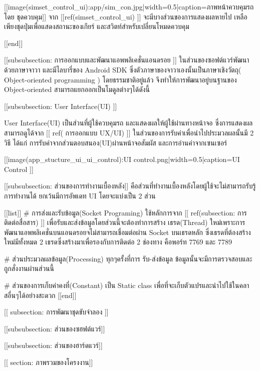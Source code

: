 				[[image(simset_control_ui):app/sim_con.jpg|width=0.5|caption=ภาพหน้าควบคุมรถโดย ชุดควบคุม]]
				จาก [[ref(simset_control_ui) ]] จะมีบางส่วนของการแสดงผลหายไป เหลือเพียงชุดปุ่มเพื่อแสดงสถานะของเกียร์ และสวิตท์สำหรับเปลี่ยนโหมดควบคุม


	        [[end]]

		[[subsubsection: การออกแบบและพัฒนาแอพพลิเคชั่นแอนดรอย ]]
			ในส่วนของซอฟต์แวร์พัฒนาด้วยภาษาจาวา และมีไลบารี่ของ Android SDK ซึ่งตัวภาษาของจาวาเองนั้นเป็นภาษาเชิงวัตถุ( Object-oriented programming ) โดยธรรมชาติอยู่แล้ว จึงทำให้การพัฒนาอยู่บนฐานของ Object-oriented สามารถแยกออกเป็นโมดูลต่างๆได้ดังนี้

			[[subsubsection: User Interface(UI) ]]

				User Interface(UI) เป็นส่วนที่ผู้ใช้ควบคุมรถ และแสดงผลให้ผู้ใช้ผ่านทางหน้าจอ ซึ่งการแสดงผลสามารถดูได้จาก [[ ref( การออกแบบ UX/UI) ]]
				ในส่วนของการรับค่าเพื่อนำไปประมวลผลนั้นมี 2 วิธี ได้แก่ การรับค่าจากส่วนตอบสนอง(UI)ผ่านหน้าจอสัมผัส และการอ่านค่าจากเซนเซอร์

				[[image(app_stucture_ui_ui_control):UI control.png|width=0.5|caption=UI Control ]]

			[[subsubsection: ส่วนของการทำงานเบื้องหลัง]]
			คือส่วนที่ทำงานเบื้องหลังโดยผู้ใช้จะไม่สามารถรับรู้การทำงานได้ ยกเว้นมีการอัพเดท UI โดยจะแบ่งเป็น 2 ส่วน
				
			[[list]]
				# การส่งและรับข้อมูล(Socket Programing) ใช้หลักการจาก [[ ref(subsection: การติดต่อสื่อสาร) ]] เพื่อรับและส่งข้อมูลโดยส่วนนี้จะต้องทำการสร้าง เธรด(Thread) ใหม่เพราะการพัฒนาแอพพลิเคชั่นบนแอนดรอยจไม่สามารถเชื่อมต่อผ่าน Socket บนเธรดหลัก ซึ่งเธรดที่ต้องสร้างใหม่มีทั้งหมด 2 เธรดซึ่งสร้างมาเพื่อรองกับการติดต่อ 2 ช่องทาง คือพอร์ท 7769 และ 7789 

				# ส่วนประมวลผลข้อมูล(Processing) ทุกๆครั้งที่การ รับ-ส่งข้อมูล ข้อมูลนั้นจะมีการตรวจสอบและถูกสั่งงานผ่านส่วนนี้

				# ส่วนของการเก็บค่าคงที่(Constant) เป็น Static class เพื่อที่จะเก็บตัวแปรและนำไปใช้ในคลาสอื่นๆได้อย่างสะดวก
			[[end]]

	[[ subsection: การพัฒนาชุดขับจำลอง ]]

		[[subsubsection: ส่วนของซฮฟต์แวร์]]


		[[subsubsection: ส่วนของฮาร์ดแวร์]]


[[ section: ภาพรวมของโครงงาน]]

